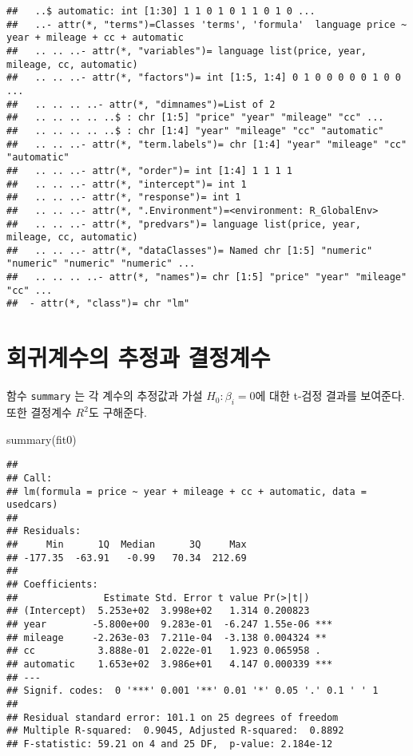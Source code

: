 \documentclass[
]{book}
\newenvironment{Shaded}{\begin{snugshade}}{\end{snugshade}}
\newcommand{\FunctionTok}[1]{\textcolor[rgb]{0.00,0.00,0.00}{#1}}
\newcommand{\NormalTok}[1]{#1}
\begin{document}
\begin{verbatim}
##   ..$ automatic: int [1:30] 1 1 0 1 0 1 1 0 1 0 ...
##   ..- attr(*, "terms")=Classes 'terms', 'formula'  language price ~ year + mileage + cc + automatic
##   .. .. ..- attr(*, "variables")= language list(price, year, mileage, cc, automatic)
##   .. .. ..- attr(*, "factors")= int [1:5, 1:4] 0 1 0 0 0 0 0 1 0 0 ...
##   .. .. .. ..- attr(*, "dimnames")=List of 2
##   .. .. .. .. ..$ : chr [1:5] "price" "year" "mileage" "cc" ...
##   .. .. .. .. ..$ : chr [1:4] "year" "mileage" "cc" "automatic"
##   .. .. ..- attr(*, "term.labels")= chr [1:4] "year" "mileage" "cc" "automatic"
##   .. .. ..- attr(*, "order")= int [1:4] 1 1 1 1
##   .. .. ..- attr(*, "intercept")= int 1
##   .. .. ..- attr(*, "response")= int 1
##   .. .. ..- attr(*, ".Environment")=<environment: R_GlobalEnv> 
##   .. .. ..- attr(*, "predvars")= language list(price, year, mileage, cc, automatic)
##   .. .. ..- attr(*, "dataClasses")= Named chr [1:5] "numeric" "numeric" "numeric" "numeric" ...
##   .. .. .. ..- attr(*, "names")= chr [1:5] "price" "year" "mileage" "cc" ...
##  - attr(*, "class")= chr "lm"
\end{verbatim}

\hypertarget{uxd68cuxadc0uxacc4uxc218uxc758-uxcd94uxc815uxacfc-uxacb0uxc815uxacc4uxc218}{%
\section{회귀계수의 추정과 결정계수}\label{uxd68cuxadc0uxacc4uxc218uxc758-uxcd94uxc815uxacfc-uxacb0uxc815uxacc4uxc218}}

함수 \texttt{summary} 는 각 계수의 추정값과 가설 \(H_0: \beta_i=0\)에 대한 t-검정 결과를 보여준다.
또한 결정계수 \(R^2\)도 구해준다.

\begin{Shaded}
\begin{Highlighting}[]
\FunctionTok{summary}\NormalTok{(fit0)}
\end{Highlighting}
\end{Shaded}

\begin{verbatim}
## 
## Call:
## lm(formula = price ~ year + mileage + cc + automatic, data = usedcars)
## 
## Residuals:
##     Min      1Q  Median      3Q     Max 
## -177.35  -63.91   -0.99   70.34  212.69 
## 
## Coefficients:
##               Estimate Std. Error t value Pr(>|t|)    
## (Intercept)  5.253e+02  3.998e+02   1.314 0.200823    
## year        -5.800e+00  9.283e-01  -6.247 1.55e-06 ***
## mileage     -2.263e-03  7.211e-04  -3.138 0.004324 ** 
## cc           3.888e-01  2.022e-01   1.923 0.065958 .  
## automatic    1.653e+02  3.986e+01   4.147 0.000339 ***
## ---
## Signif. codes:  0 '***' 0.001 '**' 0.01 '*' 0.05 '.' 0.1 ' ' 1
## 
## Residual standard error: 101.1 on 25 degrees of freedom
## Multiple R-squared:  0.9045, Adjusted R-squared:  0.8892 
## F-statistic: 59.21 on 4 and 25 DF,  p-value: 2.184e-12
\end{verbatim}
\end{document}
